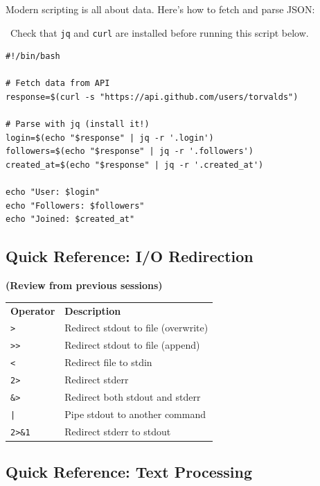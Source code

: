 \documentclass[12pt]{article}
\newcommand{\warningicon}{\faExclamationTriangle}
\begin{document}
Modern scripting is all about data. Here's how to fetch and parse JSON:

\begin{infobox}
\warningicon\ Check that \texttt{jq} and \texttt{curl} are installed before running this script below.
\end{infobox}

\begin{highlightbox}
\begin{verbatim}
#!/bin/bash

# Fetch data from API
response=$(curl -s "https://api.github.com/users/torvalds")

# Parse with jq (install it!)
login=$(echo "$response" | jq -r '.login')
followers=$(echo "$response" | jq -r '.followers')
created_at=$(echo "$response" | jq -r '.created_at')

echo "User: $login"
echo "Followers: $followers"
echo "Joined: $created_at"
\end{verbatim}
\end{highlightbox}

\subsection*{Quick Reference: I/O Redirection}

\begin{infobox}
\textbf{(Review from previous sessions)}

\begin{tabular}{ll}
\textbf{Operator} & \textbf{Description} \\
\texttt{>} & Redirect stdout to file (overwrite) \\
\texttt{>>} & Redirect stdout to file (append) \\
\texttt{<} & Redirect file to stdin \\
\texttt{2>} & Redirect stderr \\
\texttt{\&>} & Redirect both stdout and stderr \\
\texttt{|} & Pipe stdout to another command \\
\texttt{2>\&1} & Redirect stderr to stdout \\
\end{tabular}
\end{infobox}

\subsection*{Quick Reference: Text Processing}
\end{document}
